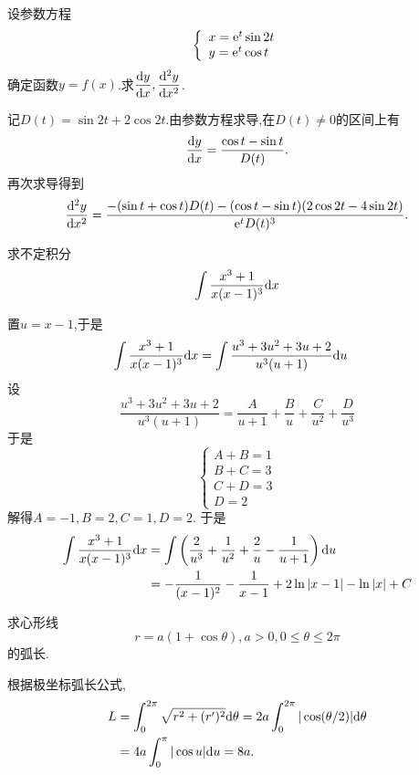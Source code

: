\documentclass{ctexart}
\begin{document}
\begin{problem}[2.(10\songti{分})]
    设参数方程$$\left\{\begin{array}{l}x=\mathrm{e}^t\sin2t\\y=\mathrm{e}^t\cos t\end{array}\right.$$确定函数$y=f(x)$.求$\dfrac{\mathrm{d} y}{\mathrm{d} x},\dfrac{\mathrm{d}^2y}{\mathrm{d} x^2}$.
\end{problem}
\begin{solution}
记$D(t)=\sin2t+2\cos2t$.由参数方程求导,在$D(t)\neq0$的区间上有
    \[\dfrac{\mathrm{d} y}{\mathrm{d} x}=\dfrac{\cos t-\sin t}{D(t)}.\]
    再次求导得到
    \[\dfrac{\mathrm{d}^2y}{\mathrm{d} x^2}
    =\dfrac{-(\sin t+\cos t)D(t)-(\cos t-\sin t)(2\cos2t-4\sin2t)}{\mathrm{e}^tD(t)^3}.\]
\end{solution}
\begin{problem}[3.(10\songti{分})]
    求不定积分$$\int\dfrac{x^3+1}{x(x-1)^3}\mathrm{d} x$$
\end{problem}
\begin{solution}
    置$u=x-1$,于是
    $$\begin{aligned}
        \int\dfrac{x^3+1}{x(x-1)^3}\mathrm{d} x
        &= \int\dfrac{u^3+3u^2+3u+2}{u^3(u+1)}\mathrm{d} u
    \end{aligned}$$
    设$$\dfrac{u^3+3u^2+3u+2}{u^3(u+1)}=\dfrac{A}{u+1}+\dfrac{B}{u}+\dfrac{C}{u^2}+\dfrac{D}{u^3}$$
    于是$$\left\{\begin{array}{l}
        A+B=1\\
        B+C=3\\
        C+D=3\\
        D=2
    \end{array}\right.$$
    解得$A=-1,B=2,C=1,D=2$.
    于是$$\begin{aligned}
        \int\dfrac{x^3+1}{x(x-1)^3}\mathrm{d} x
        &= \int\left(\dfrac{2}{u^3}+\dfrac{1}{u^2}+\dfrac{2}{u}-\dfrac{1}{u+1}\right)\mathrm{d} u\\
        &= -\dfrac{1}{(x-1)^2}-\dfrac{1}{x-1}+2\ln\left|x-1\right|-\ln\left|x\right|+C
    \end{aligned}$$
\end{solution}
\begin{problem}[4.(10\songti{分})]
    求心形线$$r=a(1+\cos\theta),a>0,0\leqslant\theta\leqslant2\pi$$的弧长.
\end{problem}
\begin{solution}
根据极坐标弧长公式,
    \[\begin{aligned}
      L&=\int_0^{2\pi}\sqrt{r^2+(r')^2}\mathrm{d}\theta
      =2a\int_0^{2\pi}|\cos(\theta/2)|\mathrm{d}\theta\\
       &=4a\int_0^\pi|\cos u|\mathrm{d} u=8a.
    \end{aligned}\]
\end{solution}
\end{document}
